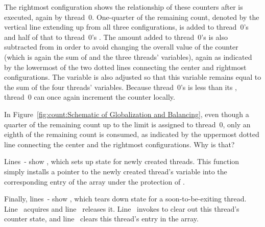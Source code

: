 The rightmost configuration shows the relationship of these counters
after  is executed, again by thread~0.
One-quarter of the remaining count, denoted by the vertical line extending
up from all three configurations, is added to thread~0's
 and half of that to thread~0's .
The amount added to thread~0's  is also subtracted from
 in order to avoid changing the overall value of the
counter (which is again the sum of  and the three
threads'  variables), again as indicated by the lowermost
of the two dotted lines connecting the center and rightmost configurations.
The  variable is also adjusted so that this variable
remains equal to the sum of the four threads' 
variables.
Because thread~0's  is less than its ,
thread~0 can once again increment the counter locally.

\QuickQuiz{}
	In Figure~\ref{fig:count:Schematic of Globalization and Balancing},
	even though a quarter of the remaining count up to the limit is
	assigned to thread~0, only an eighth of the remaining count is
	consumed, as indicated by the uppermost dotted line connecting
	the center and the rightmost configurations.
	Why is that?
 \QuickQuizEnd

\begin{lineref}
Lines~- show ,
which sets up state for
newly created threads.
This function simply installs
a pointer to the newly created thread's  variable into
the corresponding entry of the  array under the protection
of .
\end{lineref}

\begin{lineref}
Finally, lines~- show ,
which tears down
state for a soon-to-be-exiting thread.
Line~ acquires  and
line~ releases it.
Line~ invokes 
to clear out this thread's
counter state, and line~ clears this thread's entry in the
 array.
\end{lineref}

